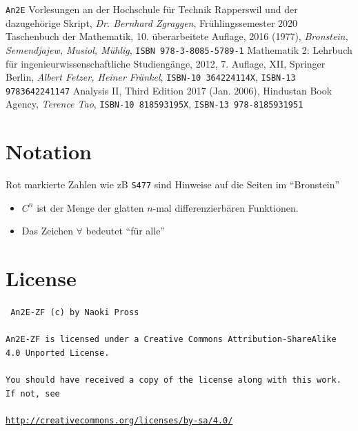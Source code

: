 \documentclass[margin=small, twocolumn]{hsrzf}
\numberwithin{equation}{subsection}
\newcommand{\brpage}[1]{\textcolor{red!70!black}{\small\texttt{S#1}}}
\begin{document}
\begin{thebibliography}{3}
    \texttt{An2E} Vorlesungen an der Hochschule f\"ur Technik Rapperswil und der dazugeh\"orige Skript,
    \textit{Dr. Bernhard Zgraggen}, Fr\"uhlingssemester 2020
    Taschenbuch der Mathematik,
    10. \"uberarbeitete Auflage, 2016 (1977),
    \textit{Bronstein, Semendjajew, Musiol, M\"uhlig}, 
    \texttt{ISBN 978-3-8085-5789-1}
    Mathematik 2: Lehrbuch für ingenieurwissenschaftliche Studieng\"ange,
    2012, 7. Auflage, XII, Springer Berlin,
    \textit{Albert Fetzer, Heiner Fränkel},
    \texttt{ISBN-10 364224114X},
    \texttt{ISBN-13 9783642241147}
    Analysis II,
    Third Edition 2017 (Jan. 2006),
    Hindustan Book Agency,
    \textit{Terence Tao},
    \texttt{ISBN-10 818593195X},
    \texttt{ISBN-13 978-8185931951}
\end{thebibliography}

\section*{Notation}
Rot markierte Zahlen wie zB \brpage{477} sind Hinweise auf die Seiten im ``Bronstein'' \cite{bronstein}

\begin{itemize}
    \item \(C^n\) ist der Menge der glatten \(n\)-mal differenzierb\"aren Funktionen.
    \item Das Zeichen \(\forall\) bedeutet ``f\"ur alle''
\end{itemize}

\section*{License}
{ \tt
An2E-ZF (c) by Naoki Pross
\\\\
An2E-ZF is licensed under a Creative Commons Attribution-ShareAlike 4.0 Unported License.
\\\\
You should have received a copy of the license along with this work. If not, see 
\\\\
{\small\url{http://creativecommons.org/licenses/by-sa/4.0/}}
}


\onecolumn
\end{document}
